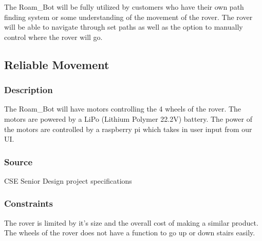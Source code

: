 
The Roam\_Bot will be fully utilized by customers who have their own path finding system or some understanding of the movement of the rover. The rover will be able to navigate through set paths as well as the option to manually control where the rover will go.

\subsection{Reliable Movement}
\subsubsection{Description}
The Roam\_Bot will have motors controlling the 4 wheels of the rover. The motors are powered by a LiPo (Lithium Polymer 22.2V) battery. The power of the motors are controlled by a raspberry pi which takes in user input from our UI. 
\subsubsection{Source}
 CSE Senior Design project specifications
\subsubsection{Constraints}
The rover is limited by it's size and the overall cost of making a similar product. The wheels of the rover does not have a function to go up or down stairs easily.
